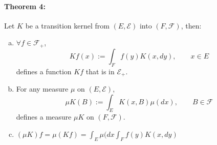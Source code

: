 \documentclass[11pt]{article}
\newcommand{\m}{\mathcal}
\begin{document}
        \paragraph{Theorem 4: }Let $K$ be a transition kernel from $(E, \m E)$ into $(F,
        \m F)$, then: 
        \begin{enumerate}[(a)]
          \item $\forall f \in \m F_+$, 
            \[ 
              K f(x) := \int _F f(y) K(x, dy), \qquad x \in E
            \]
            defines a function $Kf$ that is in $\m E_+$. 

          \item For any measure $\mu$ on $(E, \m E)$, 
            \[
              \mu K(B) := \int _E K(x, B ) \mu (dx), \qquad B \in \m F
            \]
            defines a measure $\mu K$ on $(F, \m F)$. 
          \item $(\mu K) f = \mu(K f) = \int _ E \mu (dx \int _F f(y) K(x, dy)
            $
        \end{enumerate}
\end{document}
